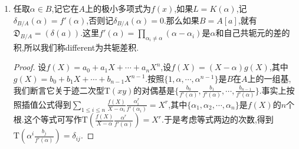 \begin{enumerate}
\begin{proof}
		\qquad
		
		此时有$\mathrm{T}_{L/K}=\sum_{\mathfrak{P}\mid\mathfrak{p}}\mathrm{T}_{L_{\mathfrak{P}}/K_{\mathfrak{p}}}$.取$y\in\widehat{B}$,按照赋值的逼近定理,可取$\eta\in L$使得$|\eta-y|_{\mathfrak{P}}\to0$和$|\eta|_{\mathfrak{P}'}\to0$,$\mathfrak{P}'\not=\mathfrak{P}$.于是如果$x\in\mathfrak{C}_{B/A}$得到$\mathrm{T}(x\eta)=\mathrm{T}_{L_{\mathfrak{P}}/K_{\mathfrak{p}}}(x\eta)+\sum_{\mathfrak{P}'\not=\mathfrak{P}}\mathrm{T}_{L_{\mathfrak{P}'}/K_{\mathfrak{p}}}(x\eta)\in\widehat{A}$.现在令$\eta$取极限,得到这个式子趋于$T_{L_{\mathfrak{P}}/K_{\mathfrak{p}}}(xy)$,按照完备性,这个极限掉在$\widehat{A}$中,于是$\mathfrak{C}_{B/A}\subset\mathfrak{C}_{\widehat{B}/\widehat{A}}$.
		
		\qquad
		
		反过来如果$x\in\mathfrak{C}_{\widehat{B}/\widehat{A}}$,可取$\xi\in L$在赋值$v_{\mathfrak{P}}$下足够接近$x$,在其它的赋值$v_{\mathfrak{P}'},\mathfrak{P}'\not=\mathfrak{P}$下接近0.我们断言有$\xi\in\mathfrak{C}_{B/A}$,任取$y\in B$,那么有:
		$$\mathrm{T}_{L/K}(\xi y)=\mathrm{T}_{L_{\mathfrak{P}}/K_{\mathfrak{p}}}((\xi-x)y)+\mathrm{T}_{L_{\mathfrak{P}}/K_{\mathfrak{p}}}(xy)+\sum_{\mathfrak{P}'\not=\mathfrak{P}}\mathrm{T}_{L_{\mathfrak{P}'}/K_{\mathfrak{p}}}(\xi y)$$
		
		这里由于$(\xi-x)y\in L$在$v_{\mathfrak{P}}$赋值下足够小(绝对值意义下足够小,加性赋值意义下足够大),$\xi y\in L$在$v_{\mathfrak{P}'}$的赋值下足够小,就导致这里第一项和最后和式每一项都在$\widehat{A}$中.第二项在$\widehat{A}$是因为$x\in\mathfrak{C}_{\widehat{B}/\widehat{A}}$.另外这些取迹的元素都是$L$中的元,所以取迹就掉在$K$里,最后按照$\widehat{A}\cap K=A$,就得到这三项都落在$A$中,于是$\xi\in\mathfrak{C}_{B/A}$.得证.
	\end{proof}
    \item 任取$\alpha\in B$,记它在$A$上的极小多项式为$f(x)$,如果$L=K(\alpha)$,记$\delta_{B/A}(\alpha)=f'(\alpha)$,否则记$\delta_{B/A}(\alpha)=0$.那么如果$B=A[a]$,就有$\mathfrak{D}_{B/A}=(\delta(a))$.这里$f'(\alpha)=\prod_{\alpha_i\not=\alpha}(\alpha-\alpha_i)$是$\alpha$和自己共轭元的差的积,所以我们称different为共轭差积.
    \begin{proof}
    	
    	设$f(X)=a_0+a_1X+\cdots+a_nX^n$,设$f(X)=(X-\alpha)g(X)$,其中$g(X)=b_0+b_1X+\cdots+b_{n-1}X^{n-1}$.按照$\{1,\alpha,\cdots,\alpha^{n-1}\}$是$B$在$A$上的一组基,我们断言它关于迹二次型$\mathrm{T}(xy)$的对偶基是$\{\frac{b_0}{f'(\alpha)},\frac{b_1}{f'(\alpha)},\cdots,\frac{b_{n-1}}{f'(\alpha)}\}$.事实上按照插值公式得到$\sum_{1\le i\le n}\frac{f(X)}{X-\alpha_i}\frac{\alpha_i^r}{f'(\alpha_i)}=X^r$,其中$\{\alpha_1,\alpha_2,\cdots,\alpha_n\}$是$f(X)$的$n$个根.这个等式可写作$\mathrm{T}(\frac{f(X)}{X-\alpha}\frac{\alpha^r}{f'(\alpha)})=X^r$.于是考虑等式两边的次数,得到$\mathrm{T}(\alpha^i\frac{b_j}{f'(\alpha)})=\delta_{ij}$.
    	

\end{proof}
\end{enumerate}
